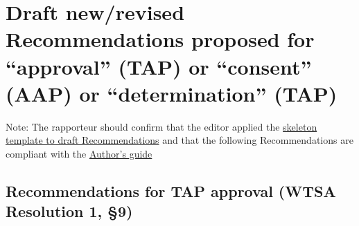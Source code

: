 



\section{Draft new/revised Recommendations proposed for ``approval'' (TAP) or ``consent'' (AAP) or ``determination'' (TAP)}\label{draft-newrevised-recommendations}

Note: The rapporteur should confirm that the editor applied the \href{https://www.itu.int/en/ITU-T/studygroups/Documents/Doc-ITUT-Recs-Skelet.docx}{skeleton template to draft Recommendations} and that the following Recommendations are compliant with the \href{https://www.itu.int/oth/T0AF000004/en}{Author's guide}

\subsection{Recommendations for TAP approval (WTSA Resolution 1, \S9)}\label{recommendations-for-tap-approval}

